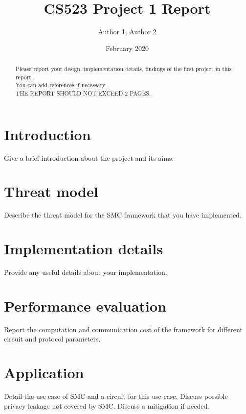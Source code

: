 \documentclass[10pt,conference,compsocconf]{IEEEtran}
\title{CS523 Project 1 Report}
\author{Author 1, Author 2}
\date{February 2020}
\begin{document}
\maketitle

\begin{abstract}
    Please report your design, implementation details, findings of the first project in this report. \\
    You can add references if necessary \cite{article}. \\
    THE REPORT SHOULD NOT EXCEED 2 PAGES.
\end{abstract}

\section{Introduction}
Give a brief introduction about the project and its aims.

\section{Threat model}
Describe the threat model for the SMC framework that you have implemented.

\section{Implementation details}
Provide any useful details about your implementation.

\section{Performance evaluation}
Report the computation and communication cost of the framework for different circuit and protocol parameters.

\section{Application}
Detail the use case of SMC and a circuit for this use case. Discuss possible privacy leakage not
covered by SMC. Discuss a mitigation if needed.



\end{document}
